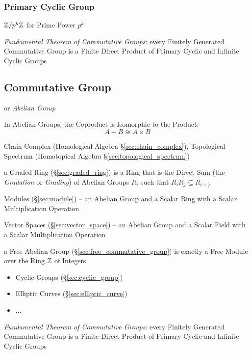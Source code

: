 \subsubsection{Primary Cyclic Group}\label{sec:primary_cyclic_group}

$\mathbb{Z}/p^k \mathbb{Z}$ for Prime Power $p^k$

\emph{Fundamental Theorem of Commutative Groups}: every Finitely Generated
Commutative Group is a Finite Direct Product of Primary Cyclic and Infinite
Cyclic Groups



\subsection{Commutative Group}\label{sec:commutative_group}

or \emph{Abelian Group}

In Abelian Groups, the Coproduct is Isomorphic to the Product:
\[
  A + B \cong A \times B
\]

\fist Chain Complex (Homological Algebra \S\ref{sec:chain_complex}), Topological
Spectrum (Homotopical Algebra \S\ref{sec:topological_spectrum})

\fist a Graded Ring (\S\ref{sec:graded_ring}) is a Ring that is the Direct Sum
(the \emph{Gradation} or \emph{Grading}) of Abelian Groups $R_i$ such that
$R_iR_j \subseteq R_{i+j}$

\fist Modules (\S\ref{sec:module}) -- an Abelian Group and a Scalar Ring with a
Scalar Multiplication Operation

\fist Vector Spaces (\S\ref{sec:vector_space}) -- an Abelian Group and a Scalar
Field with a Scalar Multiplication Operation

\fist a Free Abelian Group (\S\ref{sec:free_commutative_group}) is exactly a
Free Module over the Ring $\mathbb{Z}$ of Integers

\begin{itemize}
  \item Cyclic Groups (\S\ref{sec:cyclic_group})
  \item Elliptic Curves (\S\ref{sec:elliptic_curve})
  \item ...
\end{itemize}

\emph{Fundamental Theorem of Commutative Groups}: every Finitely Generated
Commutative Group is a Finite Direct Product of Primary Cyclic and Infinite
Cyclic Groups




